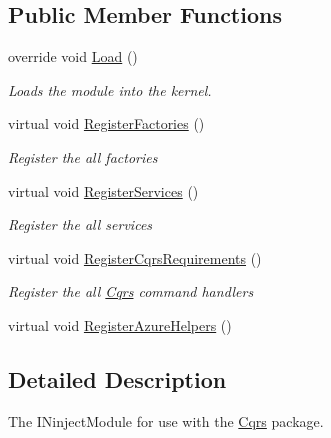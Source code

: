 \subsection*{Public Member Functions}
\begin{DoxyCompactItemize}
\item 
override void \hyperlink{classCqrs_1_1Ninject_1_1Azure_1_1DocumentDb_1_1Configuration_1_1AzureDocumentDbModule_ad9536f1eb7820c9066f2ce5f711ee55e_ad9536f1eb7820c9066f2ce5f711ee55e}{Load} ()
\begin{DoxyCompactList}\small\item\em Loads the module into the kernel. \end{DoxyCompactList}\item 
virtual void \hyperlink{classCqrs_1_1Ninject_1_1Azure_1_1DocumentDb_1_1Configuration_1_1AzureDocumentDbModule_a178aad844dd24aee601e304a0f538108_a178aad844dd24aee601e304a0f538108}{Register\+Factories} ()
\begin{DoxyCompactList}\small\item\em Register the all factories \end{DoxyCompactList}\item 
virtual void \hyperlink{classCqrs_1_1Ninject_1_1Azure_1_1DocumentDb_1_1Configuration_1_1AzureDocumentDbModule_ae47d987c2f32d3167ebda105f5fc8743_ae47d987c2f32d3167ebda105f5fc8743}{Register\+Services} ()
\begin{DoxyCompactList}\small\item\em Register the all services \end{DoxyCompactList}\item 
virtual void \hyperlink{classCqrs_1_1Ninject_1_1Azure_1_1DocumentDb_1_1Configuration_1_1AzureDocumentDbModule_ad541aab18b7ca5082dcabaaa5320a15c_ad541aab18b7ca5082dcabaaa5320a15c}{Register\+Cqrs\+Requirements} ()
\begin{DoxyCompactList}\small\item\em Register the all \hyperlink{namespaceCqrs}{Cqrs} command handlers \end{DoxyCompactList}\item 
virtual void \hyperlink{classCqrs_1_1Ninject_1_1Azure_1_1DocumentDb_1_1Configuration_1_1AzureDocumentDbModule_a6528ff9a0213bc0accd217080ff56653_a6528ff9a0213bc0accd217080ff56653}{Register\+Azure\+Helpers} ()
\end{DoxyCompactItemize}


\subsection{Detailed Description}
The I\+Ninject\+Module for use with the \hyperlink{namespaceCqrs}{Cqrs} package. 



